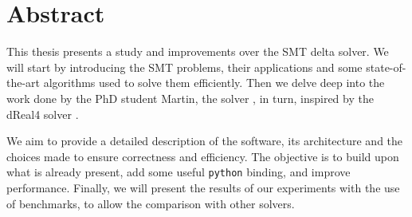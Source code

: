 \chapter*{Abstract}
This thesis presents a study and improvements over the \dlinearfour SMT delta solver.
We will start by introducing the SMT problems, their applications and some state-of-the-art algorithms used to solve them efficiently.
Then we delve deep into the work done by the PhD student Martin, the \dlinearfour solver \cite{repo:dlinear}, in turn, inspired by the dReal4 solver \cite{paper:dreal} \cite{repo:dreal}.

We aim to provide a detailed description of the software, its architecture and the choices made to ensure correctness and efficiency.
The objective is to build upon what is already present, add some useful \texttt{python} binding, and improve performance.
Finally, we will present the results of our experiments with the use of benchmarks, to allow the comparison with other solvers.

